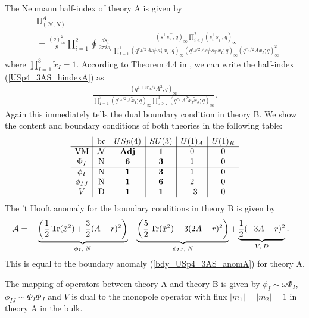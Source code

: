 \documentclass[12pt]{article}
\newcommand{\Acal}{\mathcal{A}}
\DeclareMathOperator*{\Tr}{{\rm Tr}}
\numberwithin{equation}{section}
\begin{document}
The Neumann half-index of theory A is given by
\begin{align}
\label{USp4_3AS_hindexA}
&
\mathbb{II}_{(\mathcal{N},N)}^A
\nonumber\\
&=\frac{(q)_{\infty}^2}{8} \prod_{i=1}^2 \oint \frac{ds_i}{2\pi i s_i}
\frac{(s_1^{\pm} s_2^{\mp}; q)_{\infty} \prod_{i \le j}^2 (s_i^{\pm} s_j^{\pm}; q)_{\infty}}
{\prod_{I = 1}^3 (q^{r_A/2} A s_1^{\pm} s_2^{\mp} \tilde{x}_I; q)_{\infty} (q^{r_A/2} A s_1^{\pm} s_2^{\pm} \tilde{x}_I; q)_{\infty} (q^{r_A/2} A \tilde{x}_I; q)_{\infty}^2}
\end{align}
where $\prod_{I = 1}^3 \tilde{x}_I = 1$.
According to Theorem 4.4 in \cite{MR1266569}, 
we can write the half-index (\ref{USp4_3AS_hindexA}) as
\begin{align}
\label{USp4_3AS_hindexB}
\frac{(q^{1 + 3r_A/2} A^3; q)_{\infty}}{\prod_{I=1}^{3} (q^{r_A/2} A \tilde{x}_I; q)_{\infty} \prod_{J \ge I}^{3} (q^{r_A} A^2 \tilde{x}_I \tilde{x}_J; q)_{\infty}}. 
\end{align}
Again this immediately tells the dual boundary condition in theory B. 
We show the content and boundary conditions of both theories in the following table: 
\begin{align}
\label{USp4_3AS_charges}
\begin{array}{c|c|c|c|c|c}
& \textrm{bc} & USp(4) & SU(3) & U(1)_A & U(1)_R \\ \hline
\textrm{VM} & \mathcal{N} & {\bf Adj} & {\bf 1} & 0 & 0 \\
\Phi_I & \textrm{N} & {\bf 6} & {\bf 3} & 1 & 0 \\
 \hline
\phi_I & \textrm{N} & {\bf 1} & {\bf 3} & 1 & 0 \\
\phi_{IJ} & \textrm{N} & {\bf 1} & {\bf 6} & 2 & 0 \\
V & \textrm{D} & {\bf 1} & {\bf 1} & -3 & 0
\end{array}
\end{align}
The 't Hooft anomaly for the boundary conditions in theory B is given by
\begin{align}
\label{bdy_USp4_3AS_anomB}
\Acal= & - \underbrace{\left( \frac{1}{2}\Tr(\tilde{x}^2) + \frac{3}{2}(A-r)^2 \right)}_{\phi_I, \; N}
  - \underbrace{\left( \frac{5}{2}\Tr(\tilde{x}^2) + 3(2A-r)^2 \right)}_{\phi_{IJ}, \; N}
   + \underbrace{\frac{1}{2}(-3A-r)^2}_{V, \; D}. 
\end{align}
This is equal to the boundary anomaly (\ref{bdy_USp4_3AS_anomA}) for theory A. 

The mapping of operators between theory A and theory B is given by
$\phi_I \sim \omega \Phi_I$, $\phi_{IJ} \sim \Phi_I \Phi_J$ and $V$ is dual to the monopole operator with flux $|m_1| = |m_2| = 1$ in theory A in the bulk. 
\end{document}
